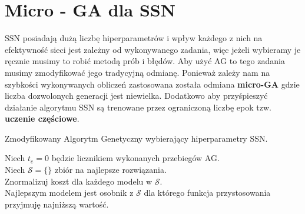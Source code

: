 \documentclass{article}
\begin{document}
\section{Micro - GA dla SSN}
SSN posiadają dużą liczbę hiperparametrów i wpływ każdego z nich na efektywność sieci jest
zależny od wykonywanego zadania, więc jeżeli wybieramy je ręcznie musimy to robić
metodą prób i błędów. Aby użyć AG to tego zadania musimy zmodyfikować jego tradycyjną odmianę.
Ponieważ zależy nam na szybkości wykonywanych obliczeń zastosowana została odmiana 
\textbf{micro-GA} gdzie liczba dozwolonych generacji jest niewielka. Dodatkowo aby przyśpieszyć
działanie algorytmu SSN są trenowane przez ograniczoną liczbę epok tzw. \textbf{uczenie
częściowe}.

\begin{algorithm}[H]
 \SetAlgoLined
 \caption{Zmodyfikowany Algorytm Genetyczny wybierający hiperparametry SSN.}
 Niech $t_e = 0$ będzie licznikiem wykonanych przebiegów AG.\\
 Niech $\mathcal{S} = \{\}$ zbiór na najlepsze rozwiązania.\\
  Znormalizuj koszt dla każdego modelu w $\mathcal{S}$.\\
  Najlepszym modelem jest osobnik z $\mathcal{S}$ dla którego funkcja przystosowania
  przyjmuję najniższą wartość.
\end{algorithm}
\end{document}
